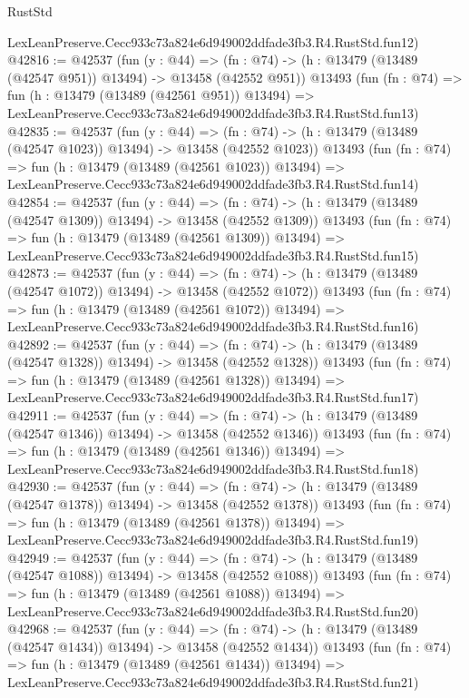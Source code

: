 \begin{lexlean}{RustStd}
\begin{coremodule}
    LexLeanPreserve.Cecc933c73a824e6d949002ddfade3fb3.R4.RustStd.fun12)
@42816 := @42537
    (fun (y : @44) =>
    (fn : @74) -> (h : @13479 (@13489 (@42547 @951)) @13494) -> @13458 (@42552 @951))
    @13493
    (fun (fn : @74) =>
    fun (h : @13479 (@13489 (@42561 @951)) @13494) =>
    LexLeanPreserve.Cecc933c73a824e6d949002ddfade3fb3.R4.RustStd.fun13)
@42835 := @42537
    (fun (y : @44) =>
    (fn : @74) -> (h : @13479 (@13489 (@42547 @1023)) @13494) -> @13458 (@42552 @1023))
    @13493
    (fun (fn : @74) =>
    fun (h : @13479 (@13489 (@42561 @1023)) @13494) =>
    LexLeanPreserve.Cecc933c73a824e6d949002ddfade3fb3.R4.RustStd.fun14)
@42854 := @42537
    (fun (y : @44) =>
    (fn : @74) -> (h : @13479 (@13489 (@42547 @1309)) @13494) -> @13458 (@42552 @1309))
    @13493
    (fun (fn : @74) =>
    fun (h : @13479 (@13489 (@42561 @1309)) @13494) =>
    LexLeanPreserve.Cecc933c73a824e6d949002ddfade3fb3.R4.RustStd.fun15)
@42873 := @42537
    (fun (y : @44) =>
    (fn : @74) -> (h : @13479 (@13489 (@42547 @1072)) @13494) -> @13458 (@42552 @1072))
    @13493
    (fun (fn : @74) =>
    fun (h : @13479 (@13489 (@42561 @1072)) @13494) =>
    LexLeanPreserve.Cecc933c73a824e6d949002ddfade3fb3.R4.RustStd.fun16)
@42892 := @42537
    (fun (y : @44) =>
    (fn : @74) -> (h : @13479 (@13489 (@42547 @1328)) @13494) -> @13458 (@42552 @1328))
    @13493
    (fun (fn : @74) =>
    fun (h : @13479 (@13489 (@42561 @1328)) @13494) =>
    LexLeanPreserve.Cecc933c73a824e6d949002ddfade3fb3.R4.RustStd.fun17)
@42911 := @42537
    (fun (y : @44) =>
    (fn : @74) -> (h : @13479 (@13489 (@42547 @1346)) @13494) -> @13458 (@42552 @1346))
    @13493
    (fun (fn : @74) =>
    fun (h : @13479 (@13489 (@42561 @1346)) @13494) =>
    LexLeanPreserve.Cecc933c73a824e6d949002ddfade3fb3.R4.RustStd.fun18)
@42930 := @42537
    (fun (y : @44) =>
    (fn : @74) -> (h : @13479 (@13489 (@42547 @1378)) @13494) -> @13458 (@42552 @1378))
    @13493
    (fun (fn : @74) =>
    fun (h : @13479 (@13489 (@42561 @1378)) @13494) =>
    LexLeanPreserve.Cecc933c73a824e6d949002ddfade3fb3.R4.RustStd.fun19)
@42949 := @42537
    (fun (y : @44) =>
    (fn : @74) -> (h : @13479 (@13489 (@42547 @1088)) @13494) -> @13458 (@42552 @1088))
    @13493
    (fun (fn : @74) =>
    fun (h : @13479 (@13489 (@42561 @1088)) @13494) =>
    LexLeanPreserve.Cecc933c73a824e6d949002ddfade3fb3.R4.RustStd.fun20)
@42968 := @42537
    (fun (y : @44) =>
    (fn : @74) -> (h : @13479 (@13489 (@42547 @1434)) @13494) -> @13458 (@42552 @1434))
    @13493
    (fun (fn : @74) =>
    fun (h : @13479 (@13489 (@42561 @1434)) @13494) =>
    LexLeanPreserve.Cecc933c73a824e6d949002ddfade3fb3.R4.RustStd.fun21)

\end{coremodule}
\end{lexlean}

